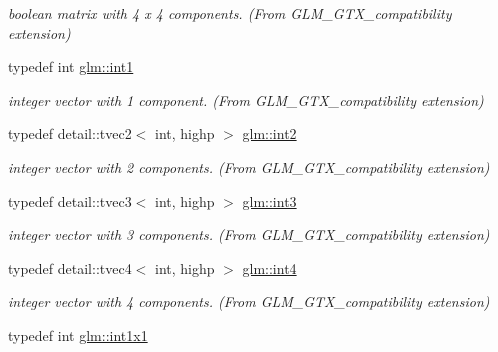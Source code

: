 \begin{DoxyCompactItemize}
\begin{DoxyCompactList}\small\item\em boolean matrix with 4 x 4 components. (From G\+L\+M\+\_\+\+G\+T\+X\+\_\+compatibility extension) \end{DoxyCompactList}\item 
typedef int \hyperlink{group__gtx__compatibility_gaba41d7803e4b24c17656d74377b88286}{glm\+::int1}\hypertarget{group__gtx__compatibility_gaba41d7803e4b24c17656d74377b88286}{}\label{group__gtx__compatibility_gaba41d7803e4b24c17656d74377b88286}

\begin{DoxyCompactList}\small\item\em integer vector with 1 component. (From G\+L\+M\+\_\+\+G\+T\+X\+\_\+compatibility extension) \end{DoxyCompactList}\item 
typedef detail\+::tvec2$<$ int, highp $>$ \hyperlink{group__gtx__compatibility_ga3f999377257cbda84c745b688ddcba81}{glm\+::int2}\hypertarget{group__gtx__compatibility_ga3f999377257cbda84c745b688ddcba81}{}\label{group__gtx__compatibility_ga3f999377257cbda84c745b688ddcba81}

\begin{DoxyCompactList}\small\item\em integer vector with 2 components. (From G\+L\+M\+\_\+\+G\+T\+X\+\_\+compatibility extension) \end{DoxyCompactList}\item 
typedef detail\+::tvec3$<$ int, highp $>$ \hyperlink{group__gtx__compatibility_gac305b0da08fad90d91854569679c935e}{glm\+::int3}\hypertarget{group__gtx__compatibility_gac305b0da08fad90d91854569679c935e}{}\label{group__gtx__compatibility_gac305b0da08fad90d91854569679c935e}

\begin{DoxyCompactList}\small\item\em integer vector with 3 components. (From G\+L\+M\+\_\+\+G\+T\+X\+\_\+compatibility extension) \end{DoxyCompactList}\item 
typedef detail\+::tvec4$<$ int, highp $>$ \hyperlink{group__gtx__compatibility_ga9f621a690aa1c2918a9a8a684376b562}{glm\+::int4}\hypertarget{group__gtx__compatibility_ga9f621a690aa1c2918a9a8a684376b562}{}\label{group__gtx__compatibility_ga9f621a690aa1c2918a9a8a684376b562}

\begin{DoxyCompactList}\small\item\em integer vector with 4 components. (From G\+L\+M\+\_\+\+G\+T\+X\+\_\+compatibility extension) \end{DoxyCompactList}\item 
typedef int \hyperlink{group__gtx__compatibility_ga09016a637a3cd093c22e6188080ac750}{glm\+::int1x1}\hypertarget{group__gtx__compatibility_ga09016a637a3cd093c22e6188080ac750}{}\label{group__gtx__compatibility_ga09016a637a3cd093c22e6188080ac750}


\end{DoxyCompactItemize}

